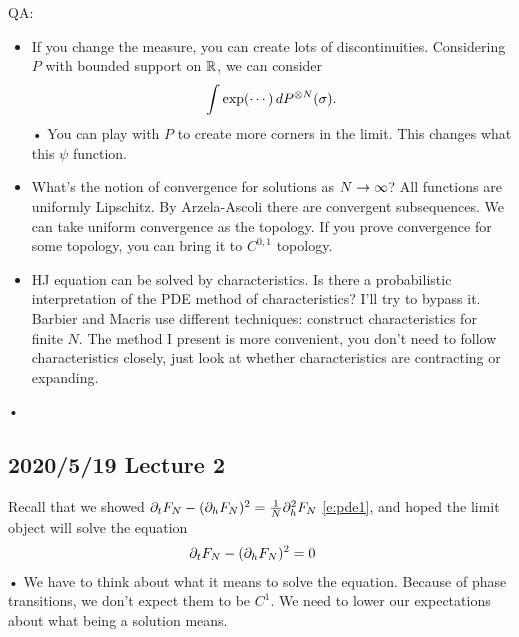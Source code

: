 QA:
\begin{itemize}
\item
If you change the measure, you can create lots of discontinuities.
Considering $P$ with bounded support on $\mathbb{R}$, we can consider
\begin{align*}
\int \exp(\cdots) \,dP^{\otimes N}(\sigma). 
\end{align*}•
You can play with $P$ to create more corners in the limit.
This changes what this $\psi$ function.
\item 
What's the notion of convergence for solutions as $N\to \infty$? All functions are uniformly Lipschitz. By Arzela-Ascoli there are convergent subsequences. We can take uniform convergence as the topology. If you prove convergence for some topology, you can bring it to $C^{0,1}$ topology.
\item 
HJ equation can be solved by characteristics. Is there a probabilistic interpretation of the PDE method of characteristics?
I'll try to bypass it. 
Barbier and Macris \cite{barbier2019adaptive} 
use different techniques: construct characteristics for finite $N$.
The method I present is more convenient, you don't need to follow characteristics closely, just look at whether characteristics are contracting or expanding. %
\end{itemize}•

\subsection*{2020/5/19 Lecture 2}

Recall that we showed $\partial_t F_N - (\partial_h F_N)^2 = \frac{1}{N} \partial_h^2 F_N$  \eqref{e:pde1}, and hoped the limit object will solve the equation
\begin{align*}
\partial_t F_N - (\partial_h F_N)^2 &=0
\end{align*}•
We have to think about what it means to solve the equation. Because of phase transitions, we don't expect them to be $C^1$.
We need to lower our expectations about what being a solution means.

